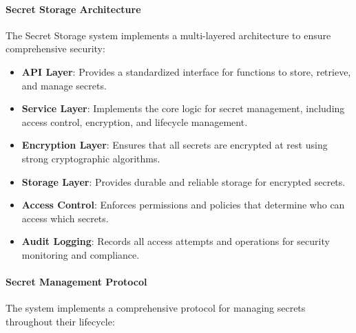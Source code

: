 \paragraph{Secret Storage Architecture}
The Secret Storage system implements a multi-layered architecture to ensure comprehensive security:

\begin{itemize}
    \item \textbf{API Layer}: Provides a standardized interface for functions to store, retrieve, and manage secrets.
    
    \item \textbf{Service Layer}: Implements the core logic for secret management, including access control, encryption, and lifecycle management.
    
    \item \textbf{Encryption Layer}: Ensures that all secrets are encrypted at rest using strong cryptographic algorithms.
    
    \item \textbf{Storage Layer}: Provides durable and reliable storage for encrypted secrets.
    
    \item \textbf{Access Control}: Enforces permissions and policies that determine who can access which secrets.
    
    \item \textbf{Audit Logging}: Records all access attempts and operations for security monitoring and compliance.
\end{itemize}

\paragraph{Secret Management Protocol}
The system implements a comprehensive protocol for managing secrets throughout their lifecycle:

